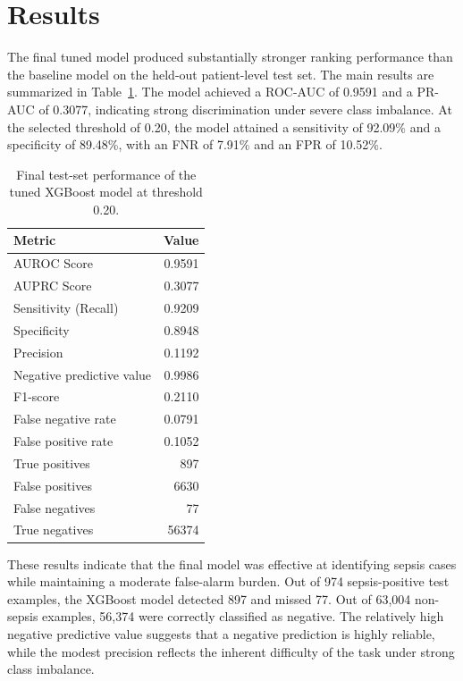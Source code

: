 \documentclass{article}
\begin{document}
\section{Results}
The final tuned model produced substantially stronger ranking performance than the 
baseline model on the held-out patient-level test set. The main results are summarized 
in Table~\ref{tab:final-metrics}. The model achieved a ROC-AUC of 0.9591 and a PR-AUC of 0.3077, 
indicating strong discrimination under severe class imbalance. At the selected threshold of 0.20, 
the model attained a sensitivity of 92.09\% and a specificity of 89.48\%, with an FNR of 7.91\% and an FPR of 10.52\%.

\begin{table}[h]
  \caption{Final test-set performance of the tuned XGBoost model at threshold 0.20.}
  \label{tab:final-metrics}
  \centering
  \begin{tabular}{lr}
    \toprule
    Metric & Value \\
    \midrule
    AUROC Score& 0.9591 \\
    AUPRC Score& 0.3077 \\
    Sensitivity (Recall) & 0.9209 \\
    Specificity & 0.8948 \\
    Precision & 0.1192 \\
    Negative predictive value & 0.9986 \\
    F1-score & 0.2110 \\
    False negative rate & 0.0791 \\
    False positive rate & 0.1052 \\
    True positives & 897 \\
    False positives & 6630 \\
    False negatives & 77 \\
    True negatives & 56374 \\
    \bottomrule
  \end{tabular}
\end{table}

These results indicate that the final model was effective at identifying sepsis cases 
while maintaining a moderate false-alarm burden. Out of 974 sepsis-positive test examples, 
the XGBoost model detected 897 and missed 77. Out of 63{,}004 non-sepsis examples, 56{,}374 were 
correctly classified as negative. The relatively high negative predictive value suggests 
that a negative prediction is highly reliable, while the modest precision reflects the inherent 
difficulty of the task under strong class imbalance.
\end{document}
